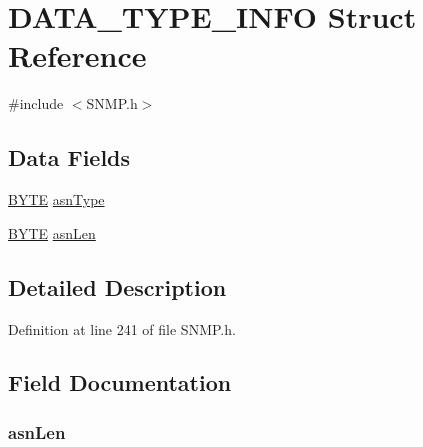\hypertarget{struct_d_a_t_a___t_y_p_e___i_n_f_o}{}\section{D\+A\+T\+A\+\_\+\+T\+Y\+P\+E\+\_\+\+I\+N\+F\+O Struct Reference}
\label{struct_d_a_t_a___t_y_p_e___i_n_f_o}


{\ttfamily \#include $<$S\+N\+M\+P.\+h$>$}

\subsection*{Data Fields}
\begin{DoxyCompactItemize}
\item 
\hyperlink{_generic_type_defs_8h_a4ae1dab0fb4b072a66584546209e7d58}{B\+Y\+T\+E} \hyperlink{struct_d_a_t_a___t_y_p_e___i_n_f_o_acfc7c9a225080cbf50b0b6ad249349f9}{asn\+Type}
\item 
\hyperlink{_generic_type_defs_8h_a4ae1dab0fb4b072a66584546209e7d58}{B\+Y\+T\+E} \hyperlink{struct_d_a_t_a___t_y_p_e___i_n_f_o_a0ce048138490dd1973c15ddf68c7a9fa}{asn\+Len}
\end{DoxyCompactItemize}


\subsection{Detailed Description}


Definition at line 241 of file S\+N\+M\+P.\+h.



\subsection{Field Documentation}
\hypertarget{struct_d_a_t_a___t_y_p_e___i_n_f_o_a0ce048138490dd1973c15ddf68c7a9fa}{}
\subsubsection[{asn\+Len}]{ asn\+Len}\label{struct_d_a_t_a___t_y_p_e___i_n_f_o_a0ce048138490dd1973c15ddf68c7a9fa}


